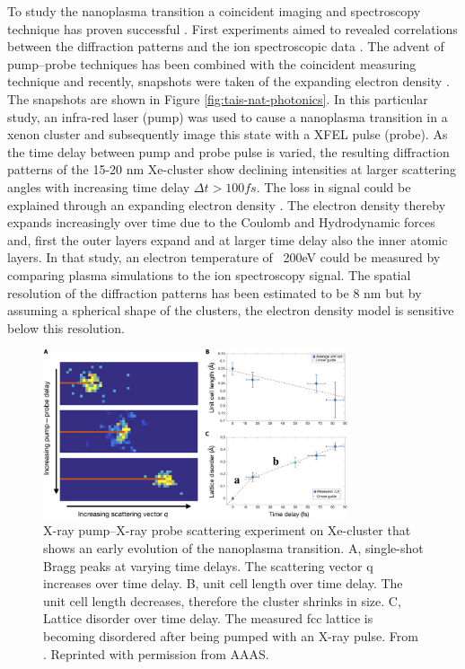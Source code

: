 To study the nanoplasma transition a coincident imaging and spectroscopy technique has proven successful \citep{Bostedt-2012-PRL}. First experiments aimed to revealed correlations between the diffraction patterns and the ion spectroscopic data \citep{Gorkhover-2012-PRL,Rupp-2016-PRL}. The advent of pump--probe techniques has been combined with the coincident measuring technique and recently, snapshots were taken of the expanding electron density \citep{Gorkhover-2016-NatPho}. The snapshots are shown in Figure \ref{fig:tais-nat-photonics}. In this particular study, an infra-red laser (pump) was used to cause a nanoplasma transition in a xenon cluster and subsequently image this state with a XFEL pulse (probe). As the time delay between pump and probe pulse is varied, the resulting diffraction patterns of the 15-20 nm Xe-cluster show declining intensities at larger scattering angles with increasing time delay $\Delta t>100 fs$. The loss in signal could be explained through an expanding electron density \citep{Hau-Riege-2008-PRE,Peltz-2014-PRL}. The electron density thereby expands increasingly over time due to the Coulomb and Hydrodynamic forces and, first the outer layers expand and at larger time delay also the inner atomic layers. In that study, an electron temperature of ~200eV could be measured by comparing plasma simulations to the ion spectroscopy signal. The spatial resolution of the diffraction patterns has been estimated to be 8 nm but by assuming a spherical shape of the clusters, the electron density model is sensitive below this resolution.\\
\begin{figure}
	\centering
		\includegraphics[width=0.80\textwidth]{images/ken-science.jpg}
	\caption[Experiment that shows early evolution of the nanoplasma transition.]{X-ray pump--X-ray probe scattering experiment on Xe-cluster that shows an early evolution of the nanoplasma transition. A, single-shot Bragg peaks at varying time delays. The scattering vector q increases over time delay. B, unit cell length over time delay. The unit cell length decreases, therefore the cluster shrinks in size. C, Lattice disorder over time delay. The measured fcc lattice is becoming disordered after being pumped with an X-ray pulse. From \citep{Ferguson-2016-SciAdv}. Reprinted with permission from AAAS.}
	\label{fig:ken-science}
\end{figure}
